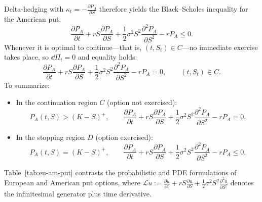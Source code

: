 Delta-hedging with $\kappa_t = -\frac{\partial P_A}{\partial S}$ therefore yields the Black--Scholes inequality for the American put:
\[
\frac{\partial P_A}{\partial t} + r S \frac{\partial P_A}{\partial S} + \frac{1}{2}\sigma^2 S^2 \frac{\partial^2 P_A}{\partial S^2} - r P_A \le 0.
\]
Whenever it is optimal to continue---that is, $(t, S_t) \in C$---no immediate exercise takes place, so $\dd\Pi_t = 0$ and equality holds:
\[
\frac{\partial P_A}{\partial t} + r S \frac{\partial P_A}{\partial S} + \frac{1}{2}\sigma^2 S^2 \frac{\partial^2 P_A}{\partial S^2} - r P_A = 0, \qquad (t, S_t) \in C.
\]
To summarize:
\begin{itemize}
    \item In the continuation region $C$ (option not exercised):
    \[
    P_A(t, S) > (K - S)^+, \qquad \frac{\partial P_A}{\partial t} + r S \frac{\partial P_A}{\partial S} + \frac{1}{2}\sigma^2 S^2 \frac{\partial^2 P_A}{\partial S^2} - r P_A = 0.
    \]
    \item In the stopping region $D$ (option exercised):
    \[
    P_A(t, S) = (K - S)^+, \qquad \frac{\partial P_A}{\partial t} + r S \frac{\partial P_A}{\partial S} + \frac{1}{2}\sigma^2 S^2 \frac{\partial^2 P_A}{\partial S^2} - r P_A \le 0.
    \]
\end{itemize}

Table~\ref{tab:eu-am-put} contrasts the probabilistic and PDE formulations of European and American put options, where $\mathcal{L} u := \frac{\partial u}{\partial t} + r S \frac{\partial u}{\partial S} + \frac{1}{2}\sigma^2 S^2 \frac{\partial^2 u}{\partial S^2}$ denotes the infinitesimal generator plus time derivative.

